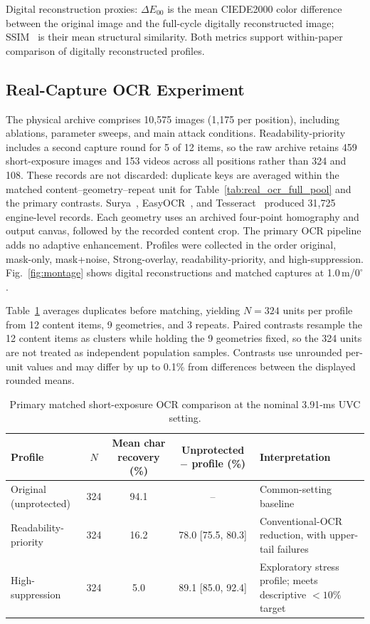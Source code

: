 \documentclass{ieeeaccess}
\begin{document}
Digital reconstruction proxies: $\Delta E_{00}$ is the mean CIEDE2000 color difference between the original image and the full-cycle digitally reconstructed image; SSIM~\cite{b_wang2004} is their mean structural similarity. Both metrics support within-paper comparison of digitally reconstructed profiles.

\subsection{Real-Capture OCR Experiment}
\label{sec:real_capture}

The physical archive comprises 10,575 images (1,175 per position), including ablations, parameter sweeps, and main attack conditions. Readability-priority includes a second capture round for 5 of 12 items, so the raw archive retains 459 short-exposure images and 153 videos across all positions rather than 324 and 108. These records are not discarded: duplicate keys are averaged within the matched content--geometry--repeat unit for Table~\ref{tab:real_ocr_full_pool} and the primary contrasts. Surya~\cite{b_surya2024}, EasyOCR~\cite{b_easyocr2020}, and Tesseract~\cite{b_smith2007} produced 31,725 engine-level records. Each geometry uses an archived four-point homography and output canvas, followed by the recorded content crop. The primary OCR pipeline adds no adaptive enhancement. Profiles were collected in the order original, mask-only, mask+noise, Strong-overlay, readability-priority, and high-suppression. Fig.~\ref{fig:montage} shows digital reconstructions and matched captures at 1.0\,m/$0^{\circ}$.

Table~\ref{tab:real_ocr_common} averages duplicates before matching, yielding $N=324$ units per profile from 12 content items, 9 geometries, and 3 repeats. Paired contrasts resample the 12 content items as clusters while holding the 9 geometries fixed, so the 324 units are not treated as independent population samples. Contrasts use unrounded per-unit values and may differ by up to 0.1\% from differences between the displayed rounded means.

\begin{table}[!t]
\caption{Primary matched short-exposure OCR comparison at the nominal 3.91-ms UVC setting.}
\label{tab:real_ocr_common}
\centering
\footnotesize
\setlength{\tabcolsep}{4.6pt}
\begin{tabular}{lcccl}
\toprule
Profile & $N$ & Mean char recovery (\%) & Unprotected $-$ profile (\%) & Interpretation \\
\midrule
Original (unprotected) & 324 & 94.1 & -- & Common-setting baseline \\
Readability-priority & 324 & 16.2 & 78.0 [75.5, 80.3] & Conventional-OCR reduction, with upper-tail failures \\
High-suppression & 324 & 5.0 & 89.1 [85.0, 92.4] & Exploratory stress profile; meets descriptive $<10\%$ target \\
\bottomrule
\end{tabular}
\end{table}
\end{document}
